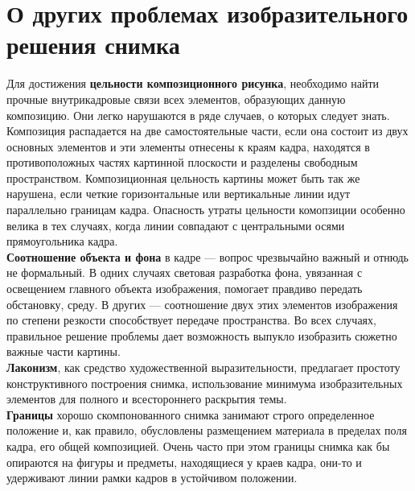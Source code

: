 \documentclass{article}
\begin{document}
\section{О других проблемах изобразительного решения снимка}
Для достижения \textbf{цельности композиционного рисунка}, необходимо найти прочные внутрикадровые связи всех элементов, образующих данную композицию. Они легко нарушаются в ряде случаев, о которых следует знать. Композиция распадается на две самостоятельные части, если она состоит из двух основных элементов и эти элементы отнесены к краям кадра, находятся в противоположных частях картинной плоскости и разделены свободным пространством. Композиционная цельность картины может быть так же нарушена, если четкие горизонтальные или вертикальные линии идут параллельно границам кадра. Опасность утраты цельности комопзиции особенно велика в тех случаях, когда линии совпадают с центральными осями прямоугольника кадра.
\\
\textbf{Соотношение объекта и фона} в кадре --- вопрос чрезвычайно важный и отнюдь не формальный. В одних случаях световая разработка фона, увязанная с освещением главного объекта изображения, помогает правдиво передать обстановку, среду. В других --- соотношение двух этих элементов изображения по степени резкости способствует передаче пространства. Во всех случаях, правильное решение проблемы дает возможность выпукло изобразить сюжетно важные части картины.
\\
\textbf{Лаконизм}, как средство художественной выразительности, предлагает простоту конструктивного построения снимка, использование минимума изобразительных элементов для полного и всестороннего раскрытия темы.
\\
\textbf{Границы} хорошо скомпонованного снимка занимают строго определенное положение и, как правило, обусловлены размещением материала в пределах поля кадра, его общей композицией. Очень часто при этом границы снимка как бы опираются на фигуры и предметы, находящиеся у краев кадра, они-то и удерживают линии рамки кадров в устойчивом положении.
\end{document}
